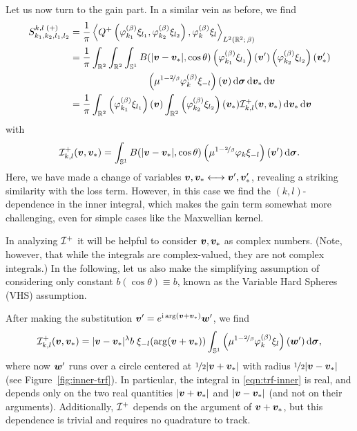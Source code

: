 Let us now turn to the gain part. In a similar vein as before, we find
\begin{align*}
    S_{k_1,k_2,l_1,l_2}^{k,l\;(+)}
    &= \frac{1}{\pi} \left\langle Q^+\left(\varphi^{(\beta)}_{k_1} \xi_{l_1},
    \varphi^{(\beta)}_{k_2} \xi_{l_2}\right), \varphi^{(\beta)}_k \xi_l \right\rangle_{L^2(\mathbb{R}^2;\,\beta)} \\
    &= \frac{1}{\pi} \int_{\mathbb{R}^2}\int_{\mathbb{R}^2}\int_{\mathbb{S}^1}B(|{\bm v}-{\bm v}_\ast|,\cos\theta)
    \left(\varphi^{(\beta)}_{k_1}\xi_{l_1}\right)({\bm v}')
    \left(\varphi^{(\beta)}_{k_2}\xi_{l_2}\right)({\bm v}_\ast') \\
    & \qquad\qquad\qquad\qquad
    \left(\mu^{1-\nicefrac{2}{\beta}}\varphi^{(\beta)}_{k}\xi_{-l}\right)({\bm v})
    \,\mathrm{d}{\bm\sigma}\,\mathrm{d}{\bm v}_\ast\,\mathrm{d}{\bm v} \\
    &= \frac{1}{\pi}
    \int_{\mathbb{R}^2} \left(\varphi^{(\beta)}_{k_1}\xi_{l_1}\right)({\bm v})
    \int_{\mathbb{R}^2} \left(\varphi^{(\beta)}_{k_2}\xi_{l_2}\right)({\bm v}_\ast)
    \mathcal{I}_{k,l}^+({\bm v},{\bm v}_\ast)\,\mathrm{d}{\bm v}_\ast\,\mathrm{d}{\bm v}
\end{align*}
with
\begin{equation} \label{eqn:inner-trf-before}
    \mathcal{I}_{k,l}^+({\bm v},{\bm v}_\ast) = \int_{\mathbb{S}^1} B(|{\bm v}-{\bm v}_\ast|, \cos\theta)
    \left(\mu^{1-\nicefrac{2}{\beta}}\varphi_{k}\xi_{-l}\right)({\bm v}') \,\mathrm{d}{\bm\sigma}.
\end{equation}
Here, we have made a change of variables ${\bm v},{\bm v}_\ast \longleftrightarrow {\bm v}',{\bm v}_\ast'$, revealing a
striking similarity with the loss term. However, in this case we find the $(k,l)$-dependence in the inner
integral, which makes the gain term somewhat more challenging, even for simple cases like the Maxwellian
kernel.

In analyzing $\mathcal{I}^+$ it will be helpful to consider ${\bm v},{\bm v}_\ast$ as complex numbers. (Note, however, that
while the integrals are complex-valued, they are not complex integrals.) In the following, let us also make
the simplifying assumption of considering only constant $b(\cos\theta)\equiv b$, known as the Variable Hard
Spheres (VHS) assumption.

After making the substitution ${\bm v}'=e^{\mathrm{i}\arg({\bm v}+{\bm v}_\ast)}{\bm w}'$, we find
\begin{equation} \label{eqn:trf-inner}
    \mathcal{I}_{k,l}^+({\bm v},{\bm v}_\ast) = |{\bm v}-{\bm v}_\ast|^\lambda b\;\xi_{-l}(\arg({\bm v}+{\bm v}_\ast))\int_{\mathbb{S}^1}
    \left(\mu^{1-\nicefrac{2}{\beta}}\varphi^{(\beta)}_k\xi_l\right)({\bm w}')\,\mathrm{d}{\bm\sigma},
\end{equation}
where now ${\bm w}'$ runs over a circle centered at $\nicefrac{1}{2}|{\bm v}+{\bm v}_\ast|$ with radius
$\nicefrac{1}{2}|{\bm v}-{\bm v}_\ast|$ (see Figure~\ref{fig:inner-trf}). In particular, the integral in
\eqref{eqn:trf-inner} is real, and depends only on the two real quantities $|{\bm v}+{\bm v}_\ast|$ and
$|{\bm v}-{\bm v}_\ast|$ (and not on their arguments).  Additionally, $\mathcal{I}^+$ depends on the argument of
${\bm v}+{\bm v}_\ast$, but this dependence is trivial and requires no quadrature to track.


